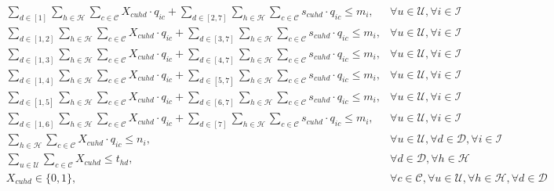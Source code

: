 \documentclass[11pt]{article}
\begin{document}
\begin{align}
&\sum\limits_{d\in[1]}\sum\limits_{h\in\mathcal{H}}\sum\limits_{c\in\mathcal{C}}X_{{c}{u}{h}{d}} \cdot q_{{i}{c}} + \sum\limits_{d\in[2,7]}\sum\limits_{h\in\mathcal{H}}\sum\limits_{c\in\mathcal{C}}s_{{c}{u}{h}{d}} \cdot q_{{i}{c}} \leq m_{i}, &\forall u \in \mathcal{U}, \forall i \in \mathcal{I} \label{mathmodel_weeklyquotalimit_rh1}&\\
&\sum\limits_{d\in[1,2]}\sum\limits_{h\in\mathcal{H}}\sum\limits_{c\in\mathcal{C}}X_{{c}{u}{h}{d}} \cdot q_{{i}{c}} + \sum\limits_{d\in[3,7]}\sum\limits_{h\in\mathcal{H}}\sum\limits_{c\in\mathcal{C}}s_{{c}{u}{h}{d}} \cdot q_{{i}{c}} \leq m_{i}, &\forall u \in \mathcal{U}, \forall i \in \mathcal{I} \label{mathmodel_weeklyquotalimit_rh2}&\\
&\sum\limits_{d\in[1,3]}\sum\limits_{h\in\mathcal{H}}\sum\limits_{c\in\mathcal{C}}X_{{c}{u}{h}{d}} \cdot q_{{i}{c}} + \sum\limits_{d\in[4,7]}\sum\limits_{h\in\mathcal{H}}\sum\limits_{c\in\mathcal{C}}s_{{c}{u}{h}{d}} \cdot q_{{i}{c}} \leq m_{i}, &\forall u \in \mathcal{U}, \forall i \in \mathcal{I} \label{mathmodel_weeklyquotalimit_rh3}&\\
&\sum\limits_{d\in[1,4]}\sum\limits_{h\in\mathcal{H}}\sum\limits_{c\in\mathcal{C}}X_{{c}{u}{h}{d}} \cdot q_{{i}{c}} + \sum\limits_{d\in[5,7]}\sum\limits_{h\in\mathcal{H}}\sum\limits_{c\in\mathcal{C}}s_{{c}{u}{h}{d}} \cdot q_{{i}{c}} \leq m_{i}, &\forall u \in \mathcal{U}, \forall i \in \mathcal{I} \label{mathmodel_weeklyquotalimit_rh4}&\\
&\sum\limits_{d\in[1,5]}\sum\limits_{h\in\mathcal{H}}\sum\limits_{c\in\mathcal{C}}X_{{c}{u}{h}{d}} \cdot q_{{i}{c}} + \sum\limits_{d\in[6,7]}\sum\limits_{h\in\mathcal{H}}\sum\limits_{c\in\mathcal{C}}s_{{c}{u}{h}{d}} \cdot q_{{i}{c}} \leq m_{i}, &\forall u \in \mathcal{U}, \forall i \in \mathcal{I} \label{mathmodel_weeklyquotalimit_rh5}&\\
&\sum\limits_{d\in[1,6]}\sum\limits_{h\in\mathcal{H}}\sum\limits_{c\in\mathcal{C}}X_{{c}{u}{h}{d}} \cdot q_{{i}{c}} + \sum\limits_{d\in[7]}\sum\limits_{h\in\mathcal{H}}\sum\limits_{c\in\mathcal{C}}s_{{c}{u}{h}{d}} \cdot q_{{i}{c}} \leq m_{i}, &\forall u \in \mathcal{U}, \forall i \in \mathcal{I} \label{mathmodel_weeklyquotalimit_rh6}&\\
&\sum\limits_{h\in\mathcal{H}}\sum\limits_{c\in\mathcal{C}}X_{{c}{u}{h}{d}} \cdot q_{{i}{c}} \leq n_{i}, &\forall u \in \mathcal{U}, \forall d \in \mathcal{D}, \forall i \in \mathcal{I} \label{mathmodel_dailyquotalimit}&\\
&\sum\limits_{u\in\mathcal{U}}\sum\limits_{c\in\mathcal{C}}X_{{c}{u}{h}{d}} \leq t_{{h}{d}}, &\forall d \in \mathcal{D}, \forall h \in \mathcal{H} \label{mathmodel_channellimit}&\\
&X_{{c}{u}{h}{d}} \in \{0,1\},&\forall c \in \mathcal{C}, \forall u \in \mathcal{U}, \forall h \in \mathcal{H}, \forall d \in \mathcal{D} \label{mathmodel_integrity}
\end{align}\\
\end{document}
